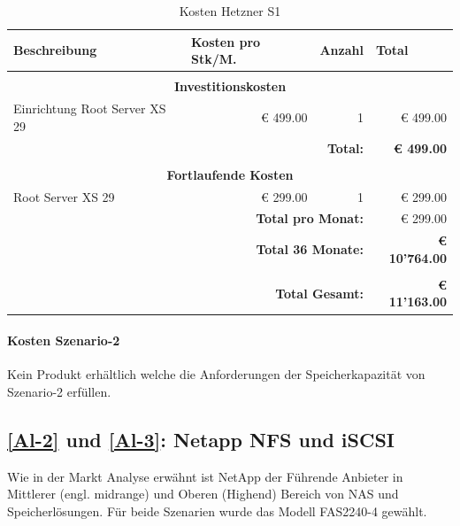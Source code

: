 \begin{table}[htbp]
\caption{Kosten Hetzner S1}
\begin{small}
\begin{tabular}{|l|r|r|r|}
\hline
\textbf{Beschreibung} & \multicolumn{1}{l|}{\textbf{Kosten pro Stk/M.}} & \multicolumn{1}{l|}{\textbf{Anzahl}} & \multicolumn{1}{l|}{\textbf{Total}} \\ \hline
 \multicolumn{ 4}{c}{} \\ \hline
\multicolumn{ 4}{|c|}{\textbf{Investitionskosten}} \\ \hline
Einrichtung Root Server XS 29 & € 499.00 & 1 & € 499.00 \\ \hline \hline
 \multicolumn{ 3}{r|}{\textbf{Total:}} & \textbf{€ 499.00} \\ 
 \cline{4-4}
\multicolumn{ 4}{c}{} \\ \hline
\multicolumn{ 4}{|c|}{\textbf{Fortlaufende Kosten}} \\ \hline
Root Server XS 29 & € 299.00 & 1 & € 299.00 \\ \hline \hline
 \multicolumn{ 3}{r|}{\textbf{Total pro Monat:}} & € 299.00 \\
\cline{4-4}
 \multicolumn{ 3}{r|}{\textbf{Total 36 Monate:}} & \textbf{€ 10'764.00} \\ \cline{4-4}
 \multicolumn{ 4}{c}{} \\ \cline{4-4}
 \multicolumn{ 3}{r|}{\textbf{Total Gesamt:}} & \textbf{€ 11'163.00} \\ \cline{4-4}
\end{tabular}
\end{small}
\label{KostenHetznerS1}
\end{table}


\paragraph*{Kosten Szenario-2}
Kein Produkt erhältlich welche die Anforderungen der Speicherkapazität von Szenario-2 erfüllen.

\subsection{\ref{Al-2} und \ref{Al-3}: Netapp NFS und iSCSI}

Wie in der Markt Analyse erwähnt ist NetApp der Führende Anbieter in Mittlerer (engl. midrange) und Oberen (Highend) Bereich von NAS und Speicherlösungen. Für beide Szenarien wurde das Modell FAS2240-4 gewählt. 

